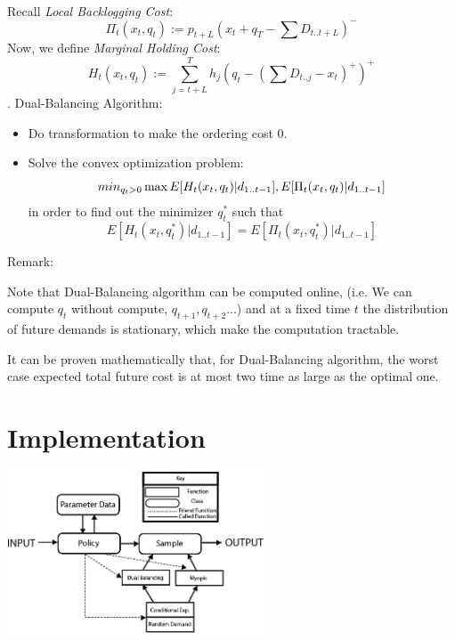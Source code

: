 \documentclass[twoside]{article}
\begin{document}
\begin{multicols}{2}
    Recall {\em Local Backlogging Cost}:
    $$\Pi_t(x_t,q_t) := p_{t+L}(x_t + q_T - \sum D_{t..t+L})^{-}$$
    Now, we define {\em Marginal Holding Cost}:
    $$H_t(x_t,q_t) := \sum_{j = t+L}^{T} h_j (q_t - (\sum D_{t..j} - x_t)^+)^+$$.
    Dual-Balancing Algorithm:
    \begin{itemize}
      \item 
        Do transformation to make the ordering cost 0.
      \item
        Solve the convex optimization problem:
        $$min_{q_t > 0}\\ \max{E[H_t(x_t,q_t)| d_{1..t-1}], E[\Pi_t(x_t,q_t)| d_{1..t-1}]}$$
        in order to find out the minimizer $q_t^*$ such that
        $$E[H_t(x_t,q_t^*)| d_{1..t-1}] = E[\Pi_t(x_t,q_t^*)| d_{1..t-1}]$$
    \end{itemize}
    Remark:
    \begin{compactitem}
      \item
      Note that Dual-Balancing algorithm can be computed online, (i.e. We can compute $q_t$ without compute, $q_{t+1}, q_{t+2} ... $) and at a fixed time $t$ the distribution of future demands is stationary, which make the computation tractable. 
      \item
      It can be proven mathematically that, for Dual-Balancing algorithm, the worst case expected total future cost is at most two time as large as the optimal one.
    \end{compactitem}


\section{Implementation}
\begin{center}
  \includegraphics[width=3.0in]{software_diagram.png}
\end{center}


\end{multicols}
\end{document}
